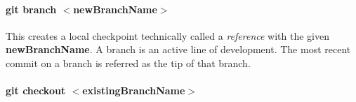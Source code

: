\documentclass[a4paper, 12pt]{article}
\begin{document}












\paragraph{git branch $<$newBranchName$>$}
This creates a local checkpoint technically called a \emph{reference} with the given \textbf{newBranchName}. A branch is an active line of development. The most recent commit on a branch is referred as the tip of that branch.

\paragraph{git checkout $<$existingBranchName$>$}
\end{document}
